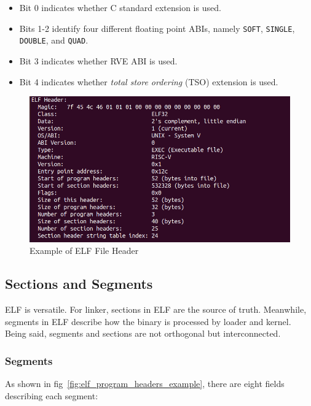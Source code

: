 \begin{itemize}
    \item Bit 0 indicates whether C standard extension is used.
    \item Bits 1-2 identify four different floating point ABIs, namely \texttt{SOFT}, \texttt{SINGLE}, \texttt{DOUBLE}, and \texttt{QUAD}.
    \item Bit 3 indicates whether RVE ABI is used.
    \item Bit 4 indicates whether \textit{total store ordering} (TSO) extension is used.
\end{itemize}

\begin{figure}
    \centering
    \includegraphics[width=.85\linewidth]{figures/ELF_Header.png}
    \caption{Example of ELF File Header}
    \label{fig:elf_header_example}
\end{figure}

\subsection{Sections and Segments}
ELF is versatile. For linker, sections in ELF are the source of truth. Meanwhile, segments in ELF describe how the binary is processed by loader and kernel. Being said, segments and sections are not orthogonal but interconnected. 

\subsubsection{Segments}
As shown in fig~\ref{fig:elf_program_headers_example}, there are eight fields describing each segment:


